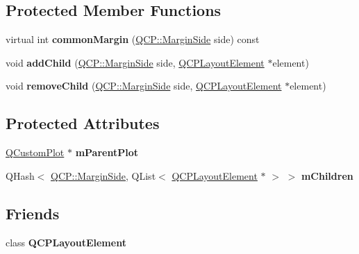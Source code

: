 \subsection*{Protected Member Functions}
\begin{DoxyCompactItemize}
\item 
\mbox{\label{class_q_c_p_margin_group_aea6a00373b3a0305de56c34d2423ea99}} 
virtual int {\bfseries common\+Margin} (\hyperlink{namespace_q_c_p_a7e487e3e2ccb62ab7771065bab7cae54}{Q\+C\+P\+::\+Margin\+Side} side) const
\item 
\mbox{\label{class_q_c_p_margin_group_acb9c3a35acec655c2895b7eb95ee0524}} 
void {\bfseries add\+Child} (\hyperlink{namespace_q_c_p_a7e487e3e2ccb62ab7771065bab7cae54}{Q\+C\+P\+::\+Margin\+Side} side, \hyperlink{class_q_c_p_layout_element}{Q\+C\+P\+Layout\+Element} $\ast$element)
\item 
\mbox{\label{class_q_c_p_margin_group_a20ab3286062957d99b58db683fe725b0}} 
void {\bfseries remove\+Child} (\hyperlink{namespace_q_c_p_a7e487e3e2ccb62ab7771065bab7cae54}{Q\+C\+P\+::\+Margin\+Side} side, \hyperlink{class_q_c_p_layout_element}{Q\+C\+P\+Layout\+Element} $\ast$element)
\end{DoxyCompactItemize}
\subsection*{Protected Attributes}
\begin{DoxyCompactItemize}
\item 
\mbox{\label{class_q_c_p_margin_group_a23cfa29e3cc0f33a59141b77d8c04edf}} 
\hyperlink{class_q_custom_plot}{Q\+Custom\+Plot} $\ast$ {\bfseries m\+Parent\+Plot}
\item 
\mbox{\label{class_q_c_p_margin_group_a954bc89ff8958b9bb6a4a0d08ed5fc0f}} 
Q\+Hash$<$ \hyperlink{namespace_q_c_p_a7e487e3e2ccb62ab7771065bab7cae54}{Q\+C\+P\+::\+Margin\+Side}, Q\+List$<$ \hyperlink{class_q_c_p_layout_element}{Q\+C\+P\+Layout\+Element} $\ast$ $>$ $>$ {\bfseries m\+Children}
\end{DoxyCompactItemize}
\subsection*{Friends}
\begin{DoxyCompactItemize}
\item 
\mbox{\label{class_q_c_p_margin_group_a0790750c7e7f14fdbd960d172655b42b}} 
class {\bfseries Q\+C\+P\+Layout\+Element}
\end{DoxyCompactItemize}


